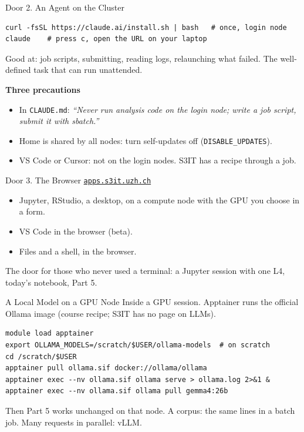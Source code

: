 \documentclass[svgnames,x11names,dvipsnames]{beamer}
\begin{document}
\begin{frame}[fragile]{Door 2. An Agent on the Cluster}
\vspace{0.1cm}
{\scriptsize
\begin{verbatim}
curl -fsSL https://claude.ai/install.sh | bash   # once, login node
claude    # press c, open the URL on your laptop
\end{verbatim}}

\vspace{0.3cm}
\small
Good at: job scripts, submitting, reading logs, relaunching what failed. The well-defined task that can run unattended.

\vspace{0.4cm}
\textbf{Three precautions}
\begin{itemize}
    \setlength{\itemsep}{4pt}
    \item In \texttt{CLAUDE.md}: \textit{``Never run analysis code on the login node; write a job script, submit it with sbatch.''}
    \item Home is shared by all nodes: turn self-updates off (\texttt{DISABLE\_UPDATES}).
    \item VS Code or Cursor: not on the login nodes. S3IT has a recipe through a job.
\end{itemize}
\end{frame}

\begin{frame}{Door 3. The Browser}
\centering
{\large \href{https://apps.s3it.uzh.ch}{\texttt{apps.s3it.uzh.ch}}}

\vspace{0.5cm}
\raggedright
\small
\begin{itemize}
    \setlength{\itemsep}{6pt}
    \item Jupyter, RStudio, a desktop, on a compute node with the GPU you choose in a form.
    \item VS Code in the browser (beta).
    \item Files and a shell, in the browser.
\end{itemize}

\vspace{0.6cm}
The door for those who never used a terminal: a Jupyter session with one L4, today's notebook, Part 5.
\end{frame}

\begin{frame}[fragile]{A Local Model on a GPU Node}
\small
Inside a GPU session. Apptainer runs the official Ollama image (course recipe; S3IT has no page on LLMs).

{\scriptsize
\begin{verbatim}
module load apptainer
export OLLAMA_MODELS=/scratch/$USER/ollama-models  # on scratch
cd /scratch/$USER
apptainer pull ollama.sif docker://ollama/ollama
apptainer exec --nv ollama.sif ollama serve > ollama.log 2>&1 &
apptainer exec --nv ollama.sif ollama pull gemma4:26b
\end{verbatim}}

\vspace{0.3cm}
Then Part 5 works unchanged on that node. A corpus: the same lines in a batch job. Many requests in parallel: vLLM.
\end{frame}
\end{document}
